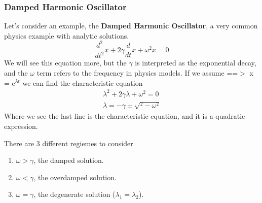 \documentclass{article}
\newcommand{\be}{\begin{equation}}
\newcommand{\ee}{\end{equation}}
\newcommand{\benum}{\begin{enumerate}}
\newcommand{\eenum}{\end{enumerate}}
\begin{document}
\subsubsection*{Damped Harmonic Oscillator}
Let's consider an example, the \textbf{Damped Harmonic Oscillator}, a very common physics example with analytic solutions.
\be
\frac{d^2}{dt^2} x + 2\gamma \frac{d}{dt} x + \omega^2 x = 0
\ee
We will see this equation more, but the $\gamma$ is interpreted as the exponential decay, and the $\omega$ term refers to the frequency in physics models.
If we assume ==$>$ x = e$^{\lambda t}$ we can find the characteristic equation
\be
\begin{split}
\lambda^2 + 2\gamma\lambda  + \omega^2 = 0\\
\lambda = -\gamma \pm \sqrt{^2 - \omega^2}
\end{split}
\ee
Where we see the last line is the characteristic equation, and it is a quadratic expression.

There are 3 different regiemes to consider
\benum
\item $\omega > \gamma$, the damped solution.
\item $\omega < \gamma$, the overdamped solution.
\item $\omega = \gamma$, the degenerate solution ($\lambda_1 = \lambda_2$).
\eenum

\end{document}
